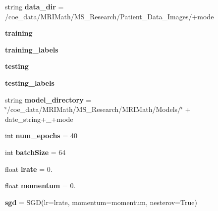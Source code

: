 \begin{DoxyCompactItemize}
string {\bfseries data\+\_\+dir} = \textquotesingle{}/coe\+\_\+data/M\+R\+I\+Math/M\+S\+\_\+\+Research/Patient\+\_\+\+Data\+\_\+\+Images/\textquotesingle{}+mode
\item 
\mbox{\label{namespaceTrainModels_a8026c2bd61636d5dd0f68fb1fdc6409a}} 
{\bfseries training}
\item 
\mbox{\label{namespaceTrainModels_aa04cd3ec8d1400d9e53b8c2c49df8a6c}} 
{\bfseries training\+\_\+labels}
\item 
\mbox{\label{namespaceTrainModels_a02724a94b2ba637116d11770cd857f56}} 
{\bfseries testing}
\item 
\mbox{\label{namespaceTrainModels_aa3f7691f033b85684585627bfb5d17ab}} 
{\bfseries testing\+\_\+labels}
\item 
\mbox{\label{namespaceTrainModels_a68c53c32db93051c59f945f9f327e3b2}} 
string {\bfseries model\+\_\+directory} = \char`\"{}/coe\+\_\+data/M\+R\+I\+Math/M\+S\+\_\+\+Research/M\+R\+I\+Math/Models/\char`\"{} + date\+\_\+string+\textquotesingle{}\+\_\+\textquotesingle{}+mode
\item 
\mbox{\label{namespaceTrainModels_a9349cd5eefb6ab524a8508df379e0792}} 
int {\bfseries num\+\_\+epochs} = 40
\item 
\mbox{\label{namespaceTrainModels_a3f5079615ab0a2bf9a50c93ba1b684ce}} 
int {\bfseries batch\+Size} = 64
\item 
\mbox{\label{namespaceTrainModels_a1535ac81cb7ef7953ef866e5ecc1ff2a}} 
float {\bfseries lrate} = 0.
\item 
\mbox{\label{namespaceTrainModels_a5c99bdf4876f454d076e5668f2b00a5b}} 
float {\bfseries momentum} = 0.
\item 
\mbox{\label{namespaceTrainModels_aec58316f9aabc285d97d5d6df2786620}} 
{\bfseries sgd} = S\+GD(lr=lrate, momentum=momentum, nesterov=True)
\item 
\mbox{\label{namespaceTrainModels_a95d5fbbe706b20c173d648ed19ced95b}} 

\end{DoxyCompactItemize}
